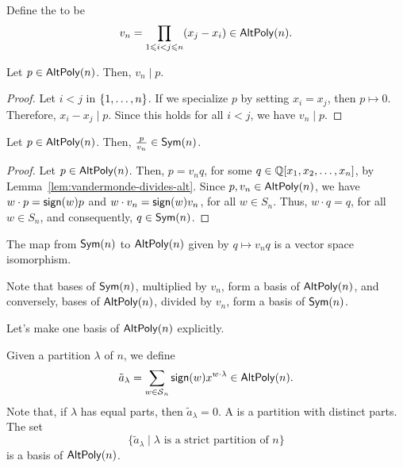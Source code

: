 \begin{definition}
    Define the  to be
    \begin{equation}
        v_n = \prod_{1 \leqslant i < j \leqslant n} (x_j - x_i) \in \operatorname{\mathsf{AltPoly}}(n).
    \end{equation}
\end{definition}

\begin{lemma} \label{lem:vandermonde-divides-alt}
    Let \(p \in \operatorname{\mathsf{AltPoly}}(n)\).
    Then, \(v_n \mid p\).
\end{lemma}

\begin{proof}
    Let \(i < j\) in \(\interval{n}\).
    If we specialize \(p\) by setting \(x_i = x_j\), then \(p \mapsto 0\).
    Therefore, \(x_i - x_j \mid p\).
    Since this holds for all \(i < j\), we have \(v_n \mid p\).
\end{proof}

\begin{lemma} \label{lem:vandermonde-times-sym-is-alt}
    Let \(p \in \operatorname{\mathsf{AltPoly}}(n)\).
    Then, \(\frac{p}{v_n} \in \operatorname{\mathsf{Sym}}(n)\).
\end{lemma}

\begin{proof}
    Let \(p \in \operatorname{\mathsf{AltPoly}}(n)\).
    Then, \(p = v_n q\), for some \(q \in \mathbb{Q}[x_1, x_2, \ldots, x_n]\),
    by Lemma~\ref{lem:vandermonde-divides-alt}.
    Since \(p, v_n \in \operatorname{\mathsf{AltPoly}}(n)\),
    we have \(w \cdot p = \operatorname{\mathsf{sign}}(w) p\) and \(w \cdot v_n = \operatorname{\mathsf{sign}}(w) v_n\), for all \(w \in S_n\).
    Thus, \(w \cdot q = q\), for all \(w \in S_n\), and consequently, \(q \in \operatorname{\mathsf{Sym}}(n)\).
\end{proof}

\begin{corollary}
    The map from \(\operatorname{\mathsf{Sym}}(n)\) to \(\operatorname{\mathsf{AltPoly}}(n)\) given by \(q \mapsto v_n q\) is a vector space isomorphism.
\end{corollary}

Note that bases of \(\operatorname{\mathsf{Sym}}(n)\), multiplied by \(v_n\), form a basis of \(\operatorname{\mathsf{AltPoly}}(n)\), and conversely, bases of \(\operatorname{\mathsf{AltPoly}}(n)\), divided by \(v_n\), form a basis of \(\operatorname{\mathsf{Sym}}(n)\).

Let's make one basis of \(\operatorname{\mathsf{AltPoly}}(n)\) explicitly.

Given a partition \(\lambda\) of \(n\),
we define
\begin{equation}
    \tilde{a}_\lambda
    =
    \sum_{w \in \operatorname{\mathcal{S}}_n}
    \operatorname{\mathsf{sign}}(w)
    x^{w \cdot \lambda} \in \operatorname{\mathsf{AltPoly}}(n).
\end{equation}
Note that, if \(\lambda\) has equal parts, then \(\tilde{a}_\lambda = 0\).
A  is a partition with distinct parts.
The set 
\begin{equation}
    \{ \tilde{a}_\lambda \mid \lambda \text{ is a strict partition of } n \}
\end{equation}
is a basis of \(\operatorname{\mathsf{AltPoly}}(n)\).

